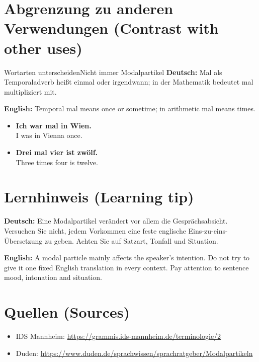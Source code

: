 \documentclass[a4paper,11pt]{article}
\newcommand{\GermanText}[1]{\textbf{Deutsch: }#1\par}
\newcommand{\EnglishText}[1]{{\small\color{SoftGray}\textbf{English: }#1\par}}
\newcommand{\ExampleItem}[2]{\item \textbf{#1}\\{\small\color{SoftGray}#2}}
\begin{document}
\section{Abgrenzung zu anderen Verwendungen \textnormal{(Contrast with other uses)}}
\begin{grammarentry}{Wortarten unterscheiden}{Nicht immer Modalpartikel}
\GermanText{Mal als Temporaladverb heißt einmal oder irgendwann; in der Mathematik bedeutet mal multipliziert mit.}
\EnglishText{Temporal mal means once or sometime; in arithmetic mal means times.}
\end{grammarentry}
\begin{exbox}\begin{itemize}
\ExampleItem{Ich war mal in Wien.}{I was in Vienna once.}
\ExampleItem{Drei mal vier ist zwölf.}{Three times four is twelve.}
\end{itemize}\end{exbox}
\section{Lernhinweis \textnormal{(Learning tip)}}
\GermanText{Eine Modalpartikel verändert vor allem die Gesprächsabsicht. Versuchen Sie nicht, jedem Vorkommen eine feste englische Eins-zu-eins-Übersetzung zu geben. Achten Sie auf Satzart, Tonfall und Situation.}
\EnglishText{A modal particle mainly affects the speaker's intention. Do not try to give it one fixed English translation in every context. Pay attention to sentence mood, intonation and situation.}
\section{Quellen \textnormal{(Sources)}}
\begin{itemize}
\item IDS Mannheim: \url{https://grammis.ids-mannheim.de/terminologie/2}
\item Duden: \url{https://www.duden.de/sprachwissen/sprachratgeber/Modalpartikeln}
\end{itemize}
\end{document}
